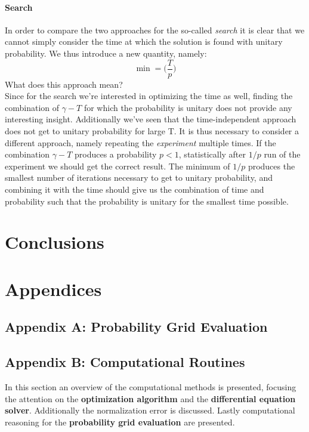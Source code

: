 \documentclass[11pt, twoside]{report}
\begin{document}
\subsubsection*{Search}
In order to compare the two approaches for the so-called \textit{search} it is clear that we cannot simply consider the time at which the solution is found with unitary probability. We thus introduce a new quantity, namely:
  \begin{equation}
    \min = \Big(\frac{T}{p}\Big)
  \end{equation}
What does this approach mean? \\
Since for the search we're interested in optimizing the time as well, finding the combination of $\gamma-T$ for which the probability is unitary does not provide any interesting insight. Additionally we've seen that the time-independent approach does not get to unitary probability for large T. It is thus necessary to consider a different approach, namely repeating the \textit{experiment} multiple times. If the combination $\gamma-T$ produces a probability $p<1$, statistically after $1/p$ run of the experiment we should get the correct result. The minimum of $1/p$ produces the smallest number of iterations necessary to get to unitary probability, and combining it with the time should give us the combination of time and probability such that the probability is unitary for the smallest time possible.



\newpage
\chapter*{Conclusions}

\newpage
\chapter*{Appendices}
\section*{Appendix A: Probability Grid Evaluation}
\section*{Appendix B: Computational Routines}
In this section an overview of the computational methods is presented, focusing the attention on the \textbf{optimization algorithm} and the \textbf{differential equation solver}. Additionally the normalization error is discussed. Lastly computational reasoning for the \textbf{probability grid evaluation} are presented. \\
\end{document}
